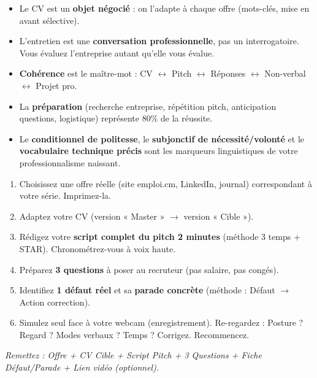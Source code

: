 \documentclass[11pt]{article}
\begin{document}
\begin{aretenir}
\begin{itemize}
    \item Le CV est un \textbf{objet négocié} : on l'adapte à chaque offre (mots-clés, mise en avant sélective).
    \item L'entretien est une \textbf{conversation professionnelle}, pas un interrogatoire. Vous évaluez l'entreprise autant qu'elle vous évalue.
    \item \textbf{Cohérence} est le maître-mot : CV $\leftrightarrow$ Pitch $\leftrightarrow$ Réponses $\leftrightarrow$ Non-verbal $\leftrightarrow$ Projet pro.
    \item La \textbf{préparation} (recherche entreprise, répétition pitch, anticipation questions, logistique) représente 80\% de la réussite.
    \item Le \textbf{conditionnel de politesse}, le \textbf{subjonctif de nécessité/volonté} et le \textbf{vocabulaire technique précis} sont les marqueurs linguistiques de votre professionnalisme naissant.
\end{itemize}
\end{aretenir}

\begin{exercice}
\begin{enumerate}
    \item Choisissez une offre réelle (site emploi.cm, LinkedIn, journal) correspondant à votre série. Imprimez-la.
    \item Adaptez votre CV (version « Master » $\rightarrow$ version « Cible »).
    \item Rédigez votre \textbf{script complet du pitch 2 minutes} (méthode 3 temps + STAR). Chronométrez-vous à voix haute.
    \item Préparez \textbf{3 questions} à poser au recruteur (pas salaire, pas congés).
    \item Identifiez \textbf{1 défaut réel} et sa \textbf{parade concrète} (méthode : Défaut $\rightarrow$ Action correction).
    \item Simulez seul face à votre webcam (enregistrement). Re-regardez : Posture ? Regard ? Modes verbaux ? Temps ? Corrigez. Recommencez.
\end{enumerate}
\textit{Remettez : Offre + CV Cible + Script Pitch + 3 Questions + Fiche Défaut/Parade + Lien vidéo (optionnel).}
\end{exercice}
\end{document}
